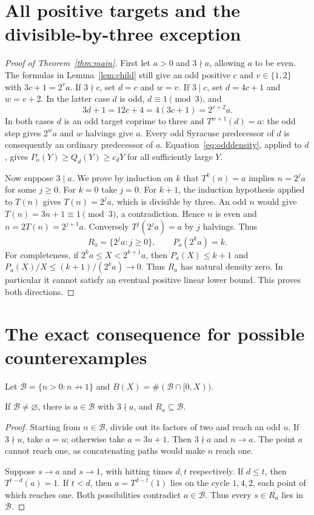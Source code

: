 \section{All positive targets and the divisible-by-three exception}
\begin{proof}[Proof of Theorem~\ref{thm:main}]
First let $a>0$ and $3\nmid a$, allowing $a$ to be even.
The formulas in Lemma~\ref{lem:child} still give an odd positive $c$ and
$v\in\{1,2\}$ with $3c+1=2^v a$. If $3\nmid c$, set $d=c$ and $w=v$.
If $3\mid c$, set $d=4c+1$ and $w=v+2$. In the latter case $d$ is odd,
$d\equiv1\pmod3$, and
\[
 3d+1=12c+4=4(3c+1)=2^{v+2}a.
\]
In both cases $d$ is an odd target coprime to three and
$T^{w+1}(d)=a$: the odd step gives $2^w a$ and $w$ halvings give $a$.
Every odd Syracuse predecessor of $d$ is consequently an ordinary
predecessor of $a$. Equation~\eqref{eq:odddensity}, applied to $d$, gives
$P_a(Y)\ge Q_d(Y)\ge c_dY$ for all sufficiently large $Y$.

Now suppose $3\mid a$. We prove by induction on $k$ that
$T^k(n)=a$ implies $n=2^j a$ for some $j\ge0$.
For $k=0$ take $j=0$. For $k+1$, the induction hypothesis applied
to $T(n)$ gives $T(n)=2^j a$, which is divisible by three.
An odd $n$ would give $T(n)=3n+1\equiv1\pmod3$, a contradiction.
Hence $n$ is even and $n=2T(n)=2^{j+1}a$.
Conversely $T^j(2^ja)=a$ by $j$ halvings. Thus
\begin{equation}\label{eq:exception}
 R_a=\{2^ja:j\ge0\},\qquad P_a(2^ka)=k.
\end{equation}
For completeness, if $2^ka\le X<2^{k+1}a$, then
$P_a(X)\le k+1$ and
$P_a(X)/X\le(k+1)/(2^ka)\to0$. Thus $R_a$ has natural density zero.
In particular it cannot satisfy an eventual positive linear lower bound.
This proves both directions.
\end{proof}

\section{The exact consequence for possible counterexamples}
Let $\mathcal B=\{n>0:n\not\longrightarrow1\}$ and
$B(X)=\#(\mathcal B\cap[0,X))$.
\begin{lemma}\label{lem:bad}
If $\mathcal B\ne\varnothing$, there is $a\in\mathcal B$ with
$3\nmid a$, and $R_a\subseteq\mathcal B$.
\end{lemma}
\begin{proof}
Starting from $n\in\mathcal B$, divide out its factors of two and reach
an odd $u$. If $3\nmid u$, take $a=u$; otherwise take $a=3u+1$.
Then $3\nmid a$ and $n\longrightarrow a$. The point $a$ cannot reach one,
as concatenating paths would make $n$ reach one.

Suppose $s\longrightarrow a$ and $s\longrightarrow1$, with hitting
times $d,t$ respectively. If $d\le t$, then $T^{t-d}(a)=1$.
If $t<d$, then $a=T^{d-t}(1)$ lies on the cycle $1,4,2$, each point
of which reaches one. Both possibilities contradict $a\in\mathcal B$.
Thus every $s\in R_a$ lies in $\mathcal B$.
\end{proof}

